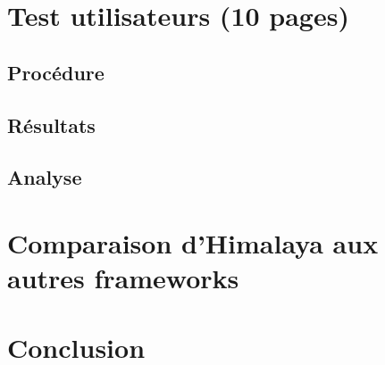 \chapter{Test utilisateurs (10 pages) }
	\section{Procédure}
	\section{Résultats}
	\section{Analyse}
\chapter{Comparaison d'Himalaya aux autres frameworks}
\chapter{Conclusion}
